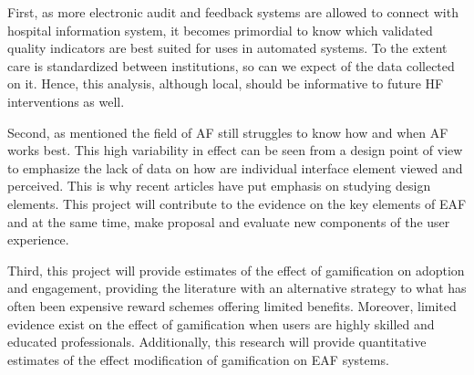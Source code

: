First, as more electronic audit and feedback systems are allowed to connect with hospital information system, it becomes primordial to know which validated quality indicators are best suited for uses in automated systems. To the extent care is standardized between institutions, so can we expect of the data collected on it. Hence, this analysis, although local, should be informative to future \gls{HF} interventions as well. 

Second, as mentioned the field of \gls{AF} still struggles to know how and when \gls{AF} works best. This high variability in effect can be seen from a design point of view to emphasize the lack of data on how are individual interface element viewed and perceived. This is why recent articles have put emphasis on studying design elements. This project will contribute to the evidence on the key elements of \gls{EAF} and at the same time, make proposal and evaluate new components of the user experience. 

Third, this project will provide estimates of the effect of gamification on adoption and engagement, providing the literature with an alternative strategy to what has often been expensive reward schemes offering limited benefits. Moreover, limited evidence exist on the effect of gamification when users are highly skilled and educated professionals. Additionally, this research will provide quantitative estimates of the effect modification of gamification on \gls{EAF} systems. 